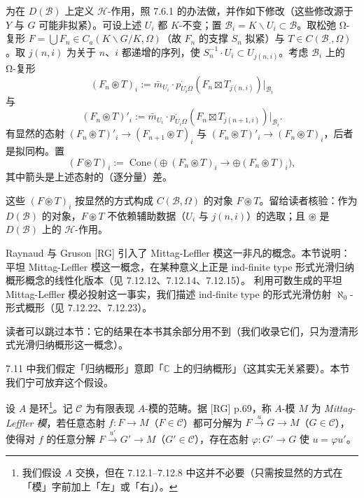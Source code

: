 为在 $D(\mathcal{B})$ 上定义 $\mathcal{H}$-作用，照 7.6.1 的办法做，并作如下修改（这些修改源于 $Y$ 与 $G$ 可能非拟紧）。可设上述 $U_i$ 都 $K$-不变；置 $\mathcal{B}_i=K\backslash U_i\subset\mathcal{B}$。取松弛 Ω-复形 $F=\bigcup F_n\in C_a(K\backslash G/K,\Omega)$（故 $F_n$ 的支撑 $S_n$ 拟紧）与 $T\in C(\mathcal{B}_{\cdot},\Omega)$。取 $j(n,i)$ 为关于 $n$、$i$ 都递增的序列，使 $S_n^{-1}\cdot U_i\subset U_{j(n,i)}$。考虑 $\mathcal{B}_i$ 上的 Ω-复形
\[
(F_n\circledast T)_i:=\bar m_{U_i}\cdot p^{\cdot}_{U_i\Omega}(F_n\boxtimes T_{j(n,i)})|_{\mathcal{B}_i}
\]
与
\[
(F_n\circledast T)'_i:=\bar m_{U_i}\cdot p^{\cdot}_{U_i\Omega}(F_n\boxtimes T_{j(n+1,i)})|_{\mathcal{B}_i}.
\]
有显然的态射 $(F_n\circledast T)'_i\to(F_{n+1}\circledast T)_i$ 与 $(F_n\circledast T)'_i\to(F_n\circledast T)_i$，后者是拟同构。置
\[
(F\circledast T)_i:=\operatorname{Cone}\big(\oplus(F_n\circledast T)_i\to\oplus(F_n\circledast T)_i\big),
\]
其中箭头是上述态射的（逐分量）差。

这些 $(F\circledast T)_i$ 按显然的方式构成 $C(\mathcal{B},\Omega)$ 的对象 $F\circledast T$。留给读者核验：作为 $D(\mathcal{B})$ 的对象，$F\circledast T$ 不依赖辅助数据（$U_i$ 与 $j(n,i)$）的选取；且 $\circledast$ 是 $D(\mathcal{B})$ 上的 $\mathcal{H}$-作用。


Raynaud 与 Gruson [RG] 引入了 Mittag-Leffler 模这一非凡的概念。本节说明：平坦 Mittag-Leffler 模这一概念，在某种意义上正是 ind-finite type 形式光滑归纳概形概念的线性化版本（见 7.12.12、7.12.14、7.12.15）。
%
利用可数生成的平坦 Mittag-Leffler 模必投射这一事实，我们描述 ind-finite type 的形式光滑仿射 $\aleph_0$-形式概形（见 7.12.22、7.12.23）。

读者可以跳过本节：它的结果在本书其余部分用不到（我们收录它们，只为澄清形式光滑归纳概形这一概念）。

7.11 中我们假定「归纳概形」意即「$\mathbb{C}$ 上的归纳概形」（这其实无关紧要）。本节我们宁可放弃这个假设。

 设 $A$ 是环\footnote{我们假设 $A$ 交换，但在 7.12.1--7.12.8 中这并不必要（只需按显然的方式在「模」字前加上「左」或「右」）。}。记 $\mathcal{C}$ 为有限表现 $A$-模的范畴。据 [RG] p.69，称 $A$-模 $M$ 为 \emph{Mittag-Leffler 模}，若任意态射 $f:F\to M$（$F\in\mathcal{C}$）都可分解为 $F\xrightarrow{u}G\to M$（$G\in\mathcal{C}$），使得对 $f$ 的任意分解 $F\xrightarrow{u'}G'\to M$（$G'\in\mathcal{C}$），存在态射 $\varphi:G'\to G$ 使 $u=\varphi u'$。

